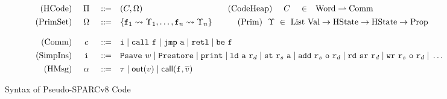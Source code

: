 \begin{figure*}[!t]
    \centering
    \vspace{-2em}
    \[
        \begin{array}{rcclcrccl}
            \TYPE{(HCode)} & \ \HMd \ & \define & (\code, \hprimset) & & 
            \qquad\,
            \TYPE{(CodeHeap)} & \ \code \ & \in & \TYPE{Word} \rightharpoonup \TYPE{Comm} 
            \\
            \\[-8pt]
            \TYPE{(PrimSet)} & \hprimset & \define & 
            \multicolumn{6}{l}
                {
                    \{ \lab{1} \rightsquigarrow \hprim_1, \dots, \lab{n} \rightsquigarrow \hprim_n \}
                    \qquad\quad
                    \TYPE{(Prim)} \ \ \hprim \ \in \ 
                    \TYPE{List} \ \TYPE{Val} \rightarrow \TYPE{HState} \rightarrow 
                    \TYPE{HState} \rightarrow \TYPE{Prop}            
                }  \\
            \\
            \TYPE{(Comm)} & \comm & \define & 
            \multicolumn{6}{l}
            {
                \simplins{} \sepline \call{} \ \lab{} 
                \sepline \jmp{} \ \aexp \sepline \retl \sepline \be{} \ \lab{}
            }  
            \\
            \\[-8pt]
            \TYPE{(SimpIns)} & \simplins{} & \define & 
            \multicolumn{6}{l}
            {
                \Psave \ \word \sepline \Prestore  \sepline \cprint \sepline 
                \ld{} \ \aexp \ \reg{d} \sepline 
                \st{} \ \reg{s} \ \aexp \sepline \cadd{} \ \reg{s} \ \oexp \ \reg{d}
                \sepline
                \rd \ \sr \ \reg{d} \sepline \cwr \ \reg{s} \ \oexp \ \reg{d} 
                \sepline \dots
            } 
            \\
            \\[-8pt]
            \TYPE{(HMsg)} & \hmsg & \define & \empmsg \sepline \outEvt{\val} \sepline 
            \callEvt{\lab{}, \args{\val}} 
        \end{array}
    \]
    \vspace{-1em}
    \caption{Syntax of Pseudo-SPARCv8 Code}
    \label{fig:syntax-of-concur-pseudo-sparc}
    \vspace{-1em}
\end{figure*}
